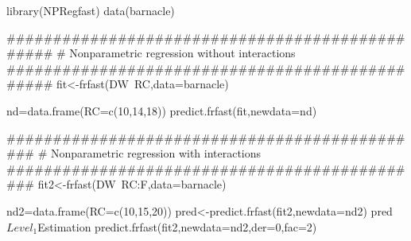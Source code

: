 \begin{Examples}
\begin{ExampleCode}
library(NPRegfast)
data(barnacle)

################################################
# Nonparametric regression without interactions
################################################
fit<-frfast(DW~RC,data=barnacle)

nd=data.frame(RC=c(10,14,18))
predict.frfast(fit,newdata=nd)


##############################################
# Nonparametric regression with interactions
##############################################
fit2<-frfast(DW~RC:F,data=barnacle)

nd2=data.frame(RC=c(10,15,20))
pred<-predict.frfast(fit2,newdata=nd2)
pred$Level_1$Estimation
predict.frfast(fit2,newdata=nd2,der=0,fac=2)
\end{ExampleCode}
\end{Examples}


